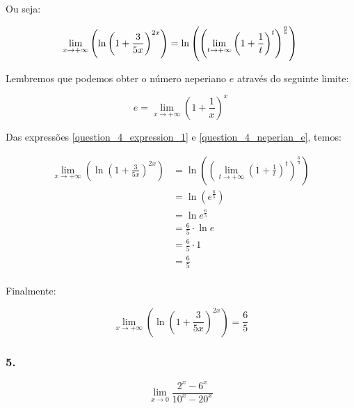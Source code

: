 \documentclass{article}
\begin{document}
Ou seja:

\begin{equation} \label{question_4_expression_1}
    \lim_{x \to +\infty}\left(\ln\left(1 + \frac{3}{5x}\right)^{2x}\right)
    = \ln \left(\left(\lim_{t \to +\infty} \left(1 + \frac{1}{t}\right)^t\right)^{\frac{6}{5}}\right) \\
\end{equation}


Lembremos que podemos obter o número neperiano \(e\) através do seguinte limite:

\begin{equation} \label{question_4_neperian_e}
    e = \lim_{x \to +\infty} \left(1 + \frac{1}{x}\right)^x
\end{equation}

Das expressões \ref{question_4_expression_1} e \ref{question_4_neperian_e}, temos:

\begin{align*}
    \lim_{x \to +\infty}\left(\ln\left(1 + \frac{3}{5x}\right)^{2x}\right)
     & = \ln \left(\left(\lim_{t \to +\infty} \left(1 + \frac{1}{t}\right)^t\right)^{\frac{6}{5}}\right) \\
     & = \ln (e^{\frac{6}{5}})                                                                           \\
     & = \ln e^{\frac{6}{5}}                                                                             \\
     & = \frac{6}{5} \cdot \ln e                                                                         \\
     & = \frac{6}{5} \cdot 1                                                                             \\
     & = \frac{6}{5}                                                                                     \\
\end{align*}

Finalmente:

\begin{equation*}
    \lim_{x \to +\infty}\left(\ln\left(1 + \frac{3}{5x}\right)^{2x}\right)
    = \frac{6}{5}
\end{equation*}


\subsubsection*{5.}

\[
    \lim_{x \to 0} \frac{2^x - 6^x}{10^x - 20^x}
\]
\end{document}
